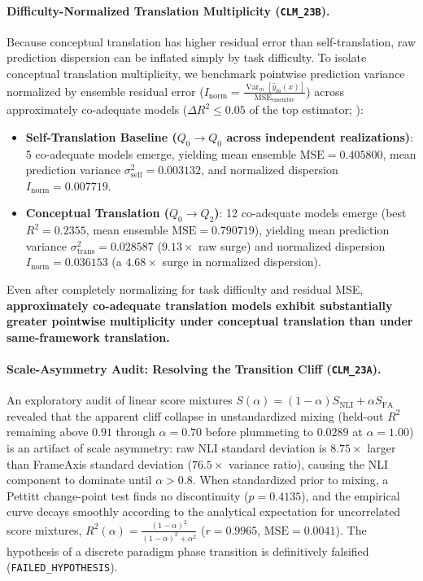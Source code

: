 \paragraph{Difficulty-Normalized Translation Multiplicity (\texttt{CLM\_23B}).}
Because conceptual translation has higher residual error than self-translation, raw prediction dispersion can be inflated simply by task difficulty. To isolate conceptual translation multiplicity, we benchmark pointwise prediction variance normalized by ensemble residual error ($I_{\text{norm}} = \frac{\operatorname{Var}_m[\hat{y}_m(x)]}{\text{MSE}_{\text{ensemble}}}$) across approximately co-adequate models ($\Delta R^2 \le 0.05$ of the top estimator; ):
\begin{itemize}
    \item \textbf{Self-Translation Baseline ($Q_0 \to Q_0$ across independent realizations)}: 5 co-adequate models emerge, yielding mean ensemble $\text{MSE} = 0.405800$, mean prediction variance $\sigma^2_{\text{self}} = \mathbf{0.003132}$, and normalized dispersion $I_{\text{norm}} = \mathbf{0.007719}$.
    \item \textbf{Conceptual Translation ($Q_0 \to Q_2$)}: 12 co-adequate models emerge (best $R^2 = 0.2355$, mean ensemble $\text{MSE} = 0.790719$), yielding mean prediction variance $\sigma^2_{\text{trans}} = \mathbf{0.028587}$ ($9.13\times$ raw surge) and normalized dispersion $I_{\text{norm}} = \mathbf{0.036153}$ (a $\mathbf{4.68\times}$ surge in normalized dispersion).
\end{itemize}
Even after completely normalizing for task difficulty and residual MSE, \textbf{approximately co-adequate translation models exhibit substantially greater pointwise multiplicity under conceptual translation than under same-framework translation.}

\paragraph{Scale-Asymmetry Audit: Resolving the Transition Cliff (\texttt{CLM\_23A}).}
An exploratory audit of linear score mixtures $S(\alpha) = (1-\alpha) S_{\text{NLI}} + \alpha S_{\text{FA}}$ revealed that the apparent cliff collapse in unstandardized mixing (held-out $R^2$ remaining above $0.91$ through $\alpha = 0.70$ before plummeting to $0.0289$ at $\alpha = 1.00$) is an artifact of scale asymmetry: raw NLI standard deviation is $8.75\times$ larger than FrameAxis standard deviation ($76.5\times$ variance ratio), causing the NLI component to dominate until $\alpha > 0.8$. When standardized prior to mixing, a Pettitt change-point test finds no discontinuity ($p = 0.4135$), and the empirical curve decays smoothly according to the analytical expectation for uncorrelated score mixtures, $R^2(\alpha) = \frac{(1-\alpha)^2}{(1-\alpha)^2 + \alpha^2}$ ($r = 0.9965$, $\mathrm{MSE} = 0.0041$). The hypothesis of a discrete paradigm phase transition is definitively falsified (\texttt{FAILED\_HYPOTHESIS}).

